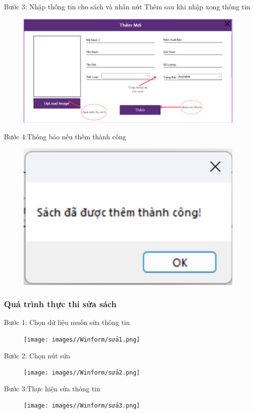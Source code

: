 \documentclass{article}
\begin{document}
Bước 3: Nhập thông tin cho sách và nhấn nút Thêm sau khi nhập xong thông tin
\begin{figure} [H]
    \centering
    \includegraphics[width=0.8\linewidth]{images//Winform/thêm3.png}
    \label{fig:enter-label}
\end{figure}

Bước 4:Thông báo nếu thêm thành công
\begin{figure} [H]
    \centering
    \includegraphics[width=0.5\linewidth]{images/Winform/thêm4.png}
    \label{fig:enter-label}
\end{figure}

\newpage
\subsubsection{Quá trình thực thi sửa sách}
Bước 1: Chọn dữ liệu muốn sửa thông tin
\begin{figure} [H]
    \centering
    \texttt{[image: images//Winform/sửa1.png]}
    \label{fig:enter-label}
\end{figure}

Bước 2: Chọn nút sửa
\begin{figure} [H]
    \centering
    \texttt{[image: images//Winform/sửa2.png]}
    \label{fig:enter-label}
\end{figure}

Bước 3:Thực hiện sửa thông tin
\begin{figure} [H]
    \centering
    \texttt{[image: images//Winform/sửa3.png]}
    \label{fig:enter-label}
\end{figure}
\end{document}
